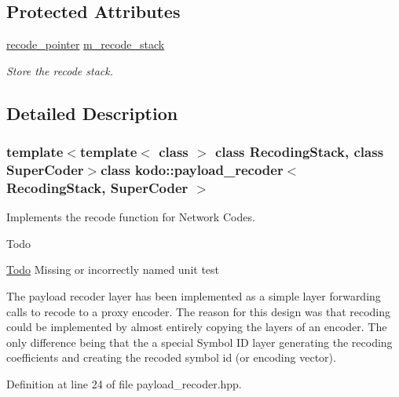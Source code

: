 \subsection*{Protected Attributes}
\begin{DoxyCompactItemize}
\item 
\hypertarget{classkodo_1_1payload__recoder_a6b77dfcf9a88c7604527897c95d0fbf8}{\hyperlink{classkodo_1_1payload__recoder_adf59d1601c93717e9f17b6baa2f73e31}{recode\-\_\-pointer} \hyperlink{classkodo_1_1payload__recoder_a6b77dfcf9a88c7604527897c95d0fbf8}{m\-\_\-recode\-\_\-stack}}\label{classkodo_1_1payload__recoder_a6b77dfcf9a88c7604527897c95d0fbf8}

\begin{DoxyCompactList}\small\item\em Store the recode stack. \end{DoxyCompactList}\end{DoxyCompactItemize}


\subsection{Detailed Description}
\subsubsection*{template$<$template$<$ class $>$ class Recoding\-Stack, class Super\-Coder$>$class kodo\-::payload\-\_\-recoder$<$ Recoding\-Stack, Super\-Coder $>$}

Implements the recode function for Network Codes. 

\begin{DoxyRefDesc}{Todo}
\item[\hyperlink{todo__todo000034}{Todo}]Missing or incorrectly named unit test\end{DoxyRefDesc}
The payload recoder layer has been implemented as a simple layer forwarding calls to recode to a proxy encoder. The reason for this design was that recoding could be implemented by almost entirely copying the layers of an encoder. The only difference being that the a special Symbol I\-D layer generating the recoding coefficients and creating the recoded symbol id (or encoding vector). 

Definition at line 24 of file payload\-\_\-recoder.\-hpp.




